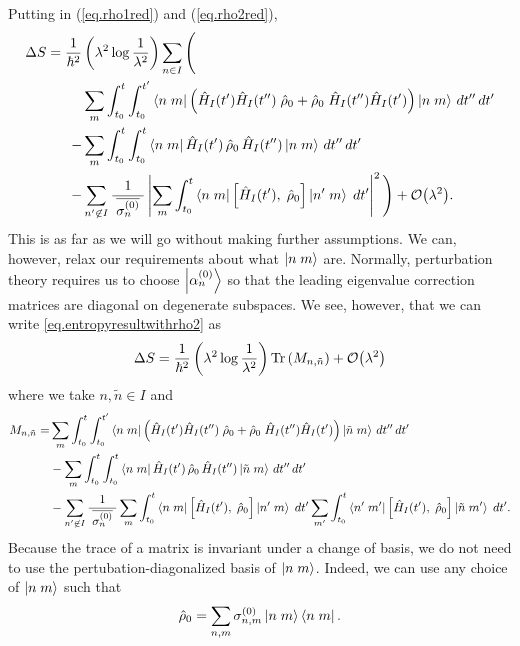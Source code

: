 Putting in (\ref{eq.rho1red}) and (\ref{eq.rho2red}),
\begin{align}\label{eq.entropyresultwithrho2}
\Delta S = \frac{1}{\hbar^2}&\left(\lambda^2 \log\frac{1}{\lambda^2}\right)\sum_{n \in I} \Bigg( \\
& \sum_m\int_{t_0}^t \int_{t_0}^{t^\prime} \left\langle n\;m\right| \left( \hat{H}_I (t^\prime) \hat{H}_I(t^{\prime\prime}) \;\hat{\rho}_0 + \hat{\rho}_0\; \hat{H}_I (t^{\prime\prime}) \hat{H}_I(t^{\prime}) \right) \left|n\;m\right\rangle\,dt^{\prime\prime}\,dt^\prime \nonumber\\
-& \sum_m\int_{t_0}^t \int_{t_0}^{t} \left\langle n\;m\right|\hat{H}_I (t^\prime) \,\hat{\rho}_0\, \hat{H}_I (t^{\prime\prime})\left|n\;m\right\rangle\,dt^{\prime\prime}\,dt^\prime \nonumber\\
-& \sum_{n^\prime \not \in I} \frac{1}{\;\overline{\sigma_n^{(0)}}\;} \left|\sum_m\int_{t_0}^t \left\langle n\;m\right| \left[\hat{H}_I(t^\prime),\; \hat{\rho}_0 \right] \left|n^\prime\;m\right\rangle\;dt^\prime \right|^2
\Bigg) + \mathcal{O}{\left(\lambda^2\right)}. \nonumber
\end{align}
This is as far as we will go without making further assumptions. We can, however, relax our requirements about what \(\left|n\;m\right\rangle\) are. Normally, perturbation theory requires us to choose \(\left|\alpha_n^{(0)}\right\rangle\) so that the leading eigenvalue correction matrices are diagonal on degenerate subspaces. We see, however, that we can write \ref{eq.entropyresultwithrho2} as 
\[
\Delta S = \frac{1}{\hbar^2}\left(\lambda^2 \log\frac{1}{\lambda^2}\right)\operatorname{Tr}\left(M_{n,\tilde{n}}\right) + \mathcal{O}{\left(\lambda^2\right)}
\]
where we take \(n,\tilde{n} \in I\) and
\begin{align*}
M_{n,\tilde{n}} = &\sum_m\int_{t_0}^t \int_{t_0}^{t^\prime} \left\langle n\;m\right| \left( \hat{H}_I (t^\prime) \hat{H}_I(t^{\prime\prime}) \;\hat{\rho}_0 + \hat{\rho}_0\; \hat{H}_I (t^{\prime\prime}) \hat{H}_I(t^{\prime}) \right) \left|\tilde{n}\;m\right\rangle\,dt^{\prime\prime}\,dt^\prime \nonumber\\
&- \sum_m\int_{t_0}^t \int_{t_0}^{t} \left\langle n\;m\right|\hat{H}_I (t^\prime) \,\hat{\rho}_0\, \hat{H}_I (t^{\prime\prime})\left|\tilde{n}\;m\right\rangle\,dt^{\prime\prime}\,dt^\prime \nonumber\\
&- \sum_{n^\prime \not \in I} \frac{1}{\;\overline{\sigma_n^{(0)}}\;} \sum_m\int_{t_0}^t \left\langle n\;m\right| \left[\hat{H}_I(t^\prime),\; \hat{\rho}_0 \right] \left|n^\prime\;m\right\rangle\;dt^\prime \sum_{m^\prime}\int_{t_0}^t \left\langle n^\prime\;m^\prime\right| \left[\hat{H}_I(t^\prime),\; \hat{\rho}_0 \right] \left|\tilde{n}\;m^\prime\right\rangle\;dt^\prime.
\end{align*}
Because the trace of a matrix is invariant under a change of basis, we do not need to use the pertubation-diagonalized basis of \(\left|n\;m\right\rangle\). Indeed, we can use any choice of \(\left|n\;m\right\rangle\) such that
\[
\hat{\rho}_0 = \sum_{n,m} \sigma_{n,m}^{(0)} \left|n\;m\right\rangle\left\langle n\;m\right|.
\]

